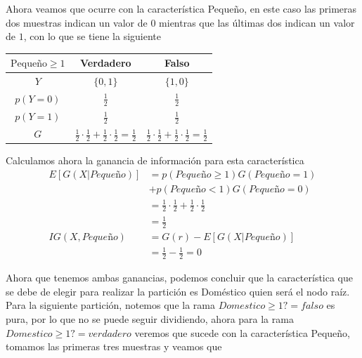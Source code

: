 Ahora veamos que ocurre con la característica Pequeño, en este caso las primeras dos muestras indican un valor de $0$ mientras que las últimas dos indican un valor de $1$, con lo que se tiene la siguiente

\begin{center}
    \begin{tabular}{c|c|c}
    $\text{Pequeño}\geq 1$ & Verdadero & Falso \\
    \hline
    $Y$ & $\{0,1\}$ & $\{1,0\}$ \\
    \hline
    $p(Y=0)$ & $\frac{1}{2}$ & $\frac{1}{2}$ \\[0.1cm]
    $p(Y=1)$ & $\frac{1}{2}$ & $\frac{1}{2}$ \\[0.1cm]
    \hline
    $G$ & $\frac{1}{2}\cdot\frac{1}{2}+\frac{1}{2}\cdot\frac{1}{2}=\frac{1}{2}$ & $\frac{1}{2}\cdot\frac{1}{2}+\frac{1}{2}\cdot\frac{1}{2}=\frac{1}{2}$
    \end{tabular}
\end{center}

Calculamos ahora la ganancia de información para esta característica
\begin{align*}
    E[G(X|Peque\text{ñ}o)] &= p(Peque\text{ñ}o\geq 1) G(Peque\text{ñ}o=1) \\&+ p(Peque\text{ñ}o<1) G(Peque\text{ñ}o=0)\\
    &= \frac{1}{2}\cdot\frac{1}{2}+\frac{1}{2}\cdot\frac{1}{2}\\
    &= \frac{1}{2}\\
    IG(X, Peque\text{ñ}o) &= G(r)-E[G(X|Peque\text{ñ}o)]\\
    &= \frac{1}{2} - \frac{1}{2} = 0
\end{align*}

Ahora que tenemos ambas ganancias, podemos concluir que la característica que se debe de elegir para realizar la partición es Doméstico quien será el nodo raíz.\\
Para la siguiente partición, notemos que la rama  $Domestico\geq 1? = falso$ es pura, por lo que no se puede seguir dividiendo, ahora para la rama $Domestico\geq 1? = verdadero$ veremos que sucede con la característica Pequeño, tomamos las primeras tres muestras y veamos que

